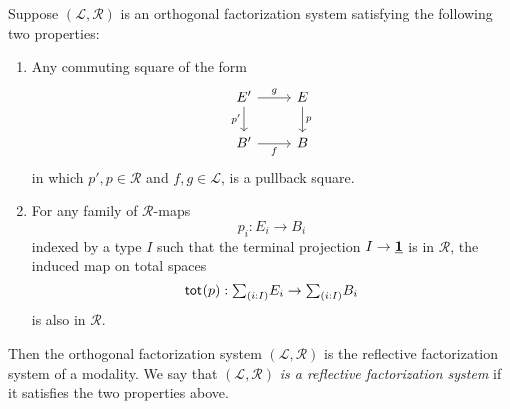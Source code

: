 \documentclass[9pt,twosided]{amsart}
\begin{document}
\begin{thm}\label{thm:rfs}
  Suppose $(\mathcal{L},\mathcal{R})$ is an orthogonal factorization system satisfying the following two properties:
  \begin{enumerate}
  \item Any commuting square of the form
    \begin{equation*}
      \begin{tikzcd}
        E' \arrow[d,swap,"{p'}"] \arrow[r,"g"] & E \arrow[d,"p"] \\
        B' \arrow[r,swap,"f"] & B
      \end{tikzcd}
    \end{equation*}
    in which $p',p\in\mathcal{R}$ and $f,g\in\mathcal{L}$, is a pullback square.
  \item For any family of $\mathcal{R}$-maps
    \begin{equation*}
      p_i:E_i\to B_i
    \end{equation*}
    indexed by a type $I$ such that the terminal projection $I\to\underline{\mathbf{1}}$ is in $\mathcal{R}$, the induced map on total spaces
    \begin{equation*}
      \total{p}:\sm{i:I}E_i\to\sm{i:I}B_i
    \end{equation*}
    is also in $\mathcal{R}$. 
  \end{enumerate}
  Then the orthogonal factorization system $(\mathcal{L},\mathcal{R})$ is the reflective factorization system of a modality. We say that $(\mathcal{L},\mathcal{R})$ \emph{is a reflective factorization system} if it satisfies the two properties above.
\end{thm}
\end{document}
